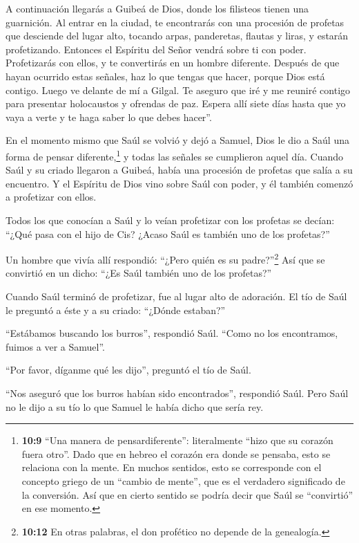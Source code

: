  A continuación llegarás a Guibeá de Dios, donde los
filisteos tienen una guarnición. Al entrar en la ciudad, te encontrarás
con una procesión de profetas que desciende del lugar alto, tocando
arpas, panderetas, flautas y liras, y estarán profetizando. 
Entonces el Espíritu del Señor vendrá sobre ti con poder. Profetizarás
con ellos, y te convertirás en un hombre diferente.  Después
de que hayan ocurrido estas señales, haz lo que tengas que hacer, porque
Dios está contigo.  Luego ve delante de mí a Gilgal. Te
aseguro que iré y me reuniré contigo para presentar holocaustos y
ofrendas de paz. Espera allí siete días hasta que yo vaya a verte y te
haga saber lo que debes hacer''.

 En el momento mismo que Saúl se volvió y dejó a Samuel,
Dios le dio a Saúl una forma de pensar diferente,\footnote{\textbf{10:9}
  ``Una manera de pensardiferente'': literalmente ``hizo que su corazón
  fuera otro''. Dado que en hebreo el corazón era donde se pensaba, esto
  se relaciona con la mente. En muchos sentidos, esto se corresponde con
  el concepto griego de un ``cambio de mente'', que es el verdadero
  significado de la conversión. Así que en cierto sentido se podría
  decir que Saúl se ``convirtió'' en ese momento.} y todas las señales
se cumplieron aquel día.  Cuando Saúl y su criado llegaron
a Guibeá, había una procesión de profetas que salía a su encuentro. Y el
Espíritu de Dios vino sobre Saúl con poder, y él también comenzó a
profetizar con ellos.

 Todos los que conocían a Saúl y lo veían profetizar con
los profetas se decían: ``¿Qué pasa con el hijo de Cis? ¿Acaso Saúl es
también uno de los profetas?''

 Un hombre que vivía allí respondió: ``¿Pero quién es su
padre?''\footnote{\textbf{10:12} En otras palabras, el don profético no
  depende de la genealogía.} Así que se convirtió en un dicho: ``¿Es
Saúl también uno de los profetas?''

 Cuando Saúl terminó de profetizar, fue al lugar alto de
adoración.  El tío de Saúl le preguntó a éste y a su
criado: ``¿Dónde estaban?''

``Estábamos buscando los burros'', respondió Saúl. ``Como no los
encontramos, fuimos a ver a Samuel''.

 ``Por favor, díganme qué les dijo'', preguntó el tío de
Saúl.

 ``Nos aseguró que los burros habían sido encontrados'',
respondió Saúl. Pero Saúl no le dijo a su tío lo que Samuel le había
dicho que sería rey.

